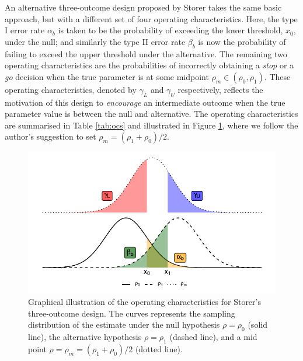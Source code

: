 \documentclass{bmcart}
\begin{document}
An alternative three-outcome design proposed by Storer \cite{Storer1992} takes the same basic approach, but with a different set of four operating characteristics. Here, the type I error rate $\alpha_b$ is taken to be the probability of exceeding the lower threshold, $x_0$, under the null; and similarly the type II error rate $\beta_b$ is now the probability of failing to exceed the upper threshold under the alternative. The remaining two operating characteristics are the probabilities of incorrectly obtaining a \emph{stop} or a \emph{go} decision when the true parameter is at some midpoint $\rho_m \in (\rho_0, \rho_1)$. These operating characteristics, denoted by $\gamma_L$ and $\gamma_U$ respectively, reflects the motivation of this design to \emph{encourage} an intermediate outcome when the true parameter value is between the null and alternative. The operating characteristics are summarised in Table \ref{tab:ocs} and illustrated in Figure \ref{fig:Stor_ocs}, where we follow the author's suggestion to set $\rho_m = (\rho_1 + \rho_0)/2$.

\begin{figure}
\centering
\includegraphics[scale=0.8]{./figures/Stor_ocs}
\caption{Graphical illustration of the operating characteristics for Storer's three-outcome design\cite{Storer1992}. The curves represents the sampling distribution of the estimate under the null hypothesis $\rho = \rho_0$ (solid line), the alternative hypothesis $\rho = \rho_1$ (dashed line), and a mid point $\rho = \rho_m = (\rho_1 + \rho_0)/2$ (dotted line).}
\label{fig:Stor_ocs}
\end{figure}
\end{document}

